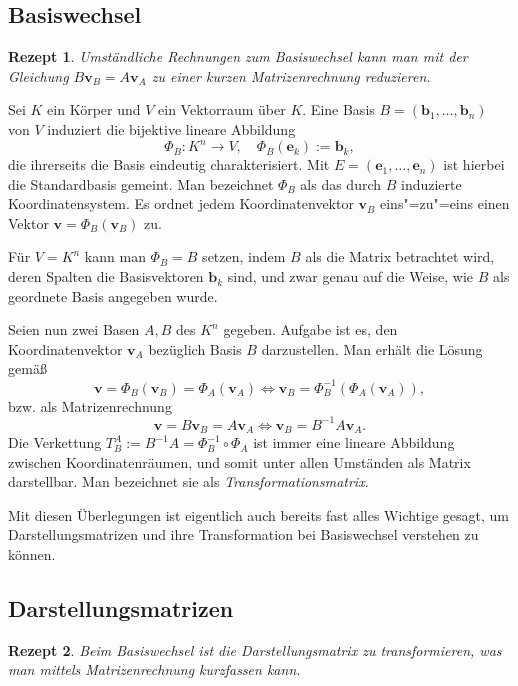\documentclass[a4paper,10pt,fleqn,twocolumn,twoside,dvipdfmx]{scrartcl}
\theoremstyle{rmbox}
\newtheorem{Rezept}{Rezept}[section]
\newcommand{\bv}[1]{\mathbf{#1}}
\begin{document}
\subsection{Basiswechsel}

\begin{Rezept}
Umständliche Rechnungen zum Basiswechsel kann man mit der
Gleichung $B\bv v_B = A\bv v_A$ zu einer kurzen Matrizenrechnung
reduzieren.
\end{Rezept}

\noindent
Sei $K$ ein Körper und $V$ ein Vektorraum über $K$.
Eine Basis $B=(\bv b_1,\ldots, \bv b_n)$ von $V$ induziert die
bijektive lineare Abbildung
\[\Phi_B\colon K^n\to V,\quad \Phi_B(\bv e_k) := \bv b_k,\]
die ihrerseits die Basis eindeutig charakterisiert. Mit
$E=(\bv e_1,\ldots,\bv e_n)$ ist hierbei die Standardbasis gemeint.
Man bezeichnet $\Phi_B$ als das durch $B$ induzierte Koordinatensystem.
Es ordnet jedem Koordinatenvektor $\bv v_B$ eins"=zu"=eins einen Vektor
$\bv v = \Phi_B(\bv v_B)$ zu.

Für $V=K^n$ kann man $\Phi_B=B$ setzen, indem $B$ als die Matrix
betrachtet wird, deren Spalten die Basisvektoren $\bv b_k$ sind,
und zwar genau auf die Weise, wie $B$ als geordnete Basis angegeben
wurde.

Seien nun zwei Basen $A,B$ des $K^n$ gegeben. Aufgabe ist es, den
Koordinatenvektor $\bv v_A$ bezüglich Basis $B$ darzustellen.
Man erhält die Lösung gemäß
\[\bv v = \Phi_B(\bv v_B) = \Phi_A(\bv v_A) \iff
\bv v_B = \Phi_B^{-1}(\Phi_A(\bv v_A)),\]
bzw. als Matrizenrechnung
\[\bv v = B\bv v_B = A\bv v_A\iff
\bv v_B = B^{-1}A\bv v_A.\]
Die Verkettung $T_B^A := B^{-1}A = \Phi_B^{-1}\circ\Phi_A$
ist immer eine lineare Abbildung zwischen
Koordinatenräumen, und somit unter allen Umständen als Matrix
darstellbar. Man bezeichnet sie als \emph{Transformationsmatrix}.

Mit diesen Überlegungen ist eigentlich auch bereits fast alles
Wichtige gesagt, um Darstellungsmatrizen und ihre Transformation
bei Basiswechsel verstehen zu können.

\subsection{Darstellungsmatrizen}
\begin{Rezept}
Beim Basiswechsel ist die Darstellungsmatrix zu transformieren,
was man mittels Matrizenrechnung kurzfassen kann.
\end{Rezept}
\end{document}
